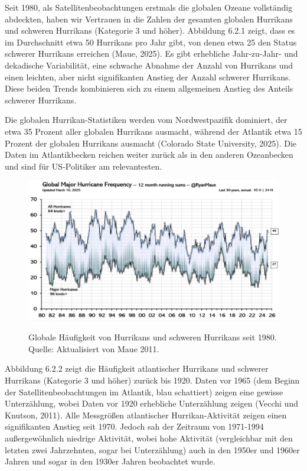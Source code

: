 \documentclass[12pt,paper=a4,DIV=12,parskip=never,chapterprefix=false,headings=standardclasses]{scrreprt}
\begin{document}
Seit 1980, als Satellitenbeobachtungen erstmals die globalen Ozeane vollständig abdeckten, haben wir Vertrauen in die Zahlen der gesamten globalen Hurrikans und schweren Hurrikans (Kategorie 3 und höher). Abbildung 6.2.1 zeigt, dass es im Durchschnitt etwa 50 Hurrikans pro Jahr gibt, von denen etwa 25 den Status schwerer Hurrikans erreichen (Maue, 2025). Es gibt erhebliche Jahr-zu-Jahr- und dekadische Variabilität, eine schwache Abnahme der Anzahl von Hurrikans und einen leichten, aber nicht signifikanten Anstieg der Anzahl schwerer Hurrikans. Diese beiden Trends kombinieren sich zu einem allgemeinen Anstieg des Anteils schwerer Hurrikans.

Die globalen Hurrikan-Statistiken werden vom Nordwestpazifik dominiert, der etwa 35 Prozent aller globalen Hurrikans ausmacht, während der Atlantik etwa 15 Prozent der globalen Hurrikans ausmacht (Colorado State University, 2025). Die Daten im Atlantikbecken reichen weiter zurück als in den anderen Ozeanbecken und sind für US-Politiker am relevantesten.

\begin{figure}[H]
\begin{center}
\includegraphics[width=1.0\textwidth]{bilder/bilderKlima-0037.jpg}\\[1cm]
\end{center}
\caption{Globale Häufigkeit von Hurrikans und schweren Hurrikans seit 1980. Quelle: Aktualisiert von Maue 2011.}
\end{figure}

Abbildung 6.2.2 zeigt die Häufigkeit atlantischer Hurrikans und schwerer Hurrikans (Kategorie 3 und höher) zurück bis 1920. Daten vor 1965 (dem Beginn der Satellitenbeobachtungen im Atlantik, blau schattiert) zeigen eine gewisse Unterzählung, wobei Daten vor 1920 erhebliche Unterzählung zeigen (Vecchi und Knutson, 2011). Alle Messgrößen atlantischer Hurrikan-Aktivität zeigen einen signifikanten Anstieg seit 1970. Jedoch sah der Zeitraum von 1971-1994 außergewöhnlich niedrige Aktivität, wobei hohe Aktivität (vergleichbar mit den letzten zwei Jahrzehnten, sogar bei Unterzählung) auch in den 1950er und 1960er Jahren und sogar in den 1930er Jahren beobachtet wurde.
\end{document}
